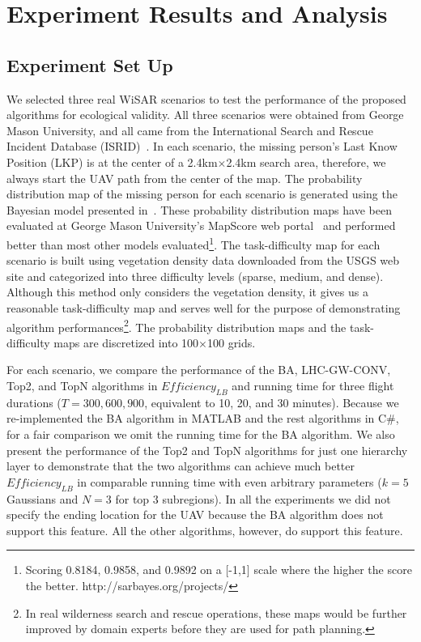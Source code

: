 \section{Experiment Results and Analysis}
\label{sec:ExperimentResultsAndAnalysis}

\subsection{Experiment Set Up}

We selected three real WiSAR scenarios to test the performance of the proposed algorithms for ecological validity. All three scenarios were obtained from George Mason University, and all came from the International Search and Rescue Incident Database (ISRID)~\cite{Koester2008Lost}. In each scenario, the missing person's Last Know Position (LKP) is at the center of a 2.4km$\times$2.4km search area, therefore, we always start the UAV path from the center of the map. The probability distribution map of the missing person for each scenario is generated using the Bayesian model presented in~\cite{Lin2010Bayesian}. These probability distribution maps have been evaluated at George Mason University's MapScore web portal~\cite{Twardy2012MapScore} and performed better than most other models evaluated\footnote{Scoring 0.8184, 0.9858, and 0.9892 on a [-1,1] scale where the higher the score the better. http://sarbayes.org/projects/}. The task-difficulty map for each scenario is built using vegetation density data downloaded from the USGS web site and categorized into three difficulty levels (sparse, medium, and dense). Although this method only considers the vegetation density, it gives us a reasonable task-difficulty map and serves well for the purpose of demonstrating algorithm performances\footnote{In real wilderness search and rescue operations, these maps would be further improved by domain experts before they are used for path planning.}. The probability distribution maps and the task-difficulty maps are discretized into 100$\times$100 grids. 

For each scenario, we compare the performance of the BA, LHC-GW-CONV, Top2, and TopN algorithms in $\mathit{Efficiency_{LB}}$ and running time for three flight durations ($T=300,600,900$, equivalent to 10, 20, and 30 minutes). Because we re-implemented the BA algorithm in MATLAB and the rest algorithms in C\#, for a fair comparison we omit the running time for the BA algorithm. We also present the performance of the Top2 and TopN algorithms for just one hierarchy layer to demonstrate that the two algorithms can achieve much better $\mathit{Efficiency_{LB}}$ in comparable running time with even arbitrary parameters ($k=5$ Gaussians and $N=3$ for top 3 subregions). In all the experiments we did not specify the ending location for the UAV because the BA algorithm does not support this feature. All the other algorithms, however, do support this feature.

